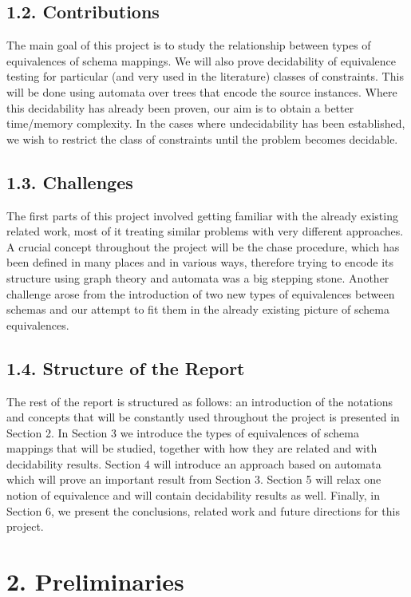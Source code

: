 \documentclass[11pt, a4paper, dvipsnames]{article}
\begin{document}
\subsection{1.2. Contributions}
The main goal of this project is to study the relationship between types of equivalences of schema mappings. We will also prove decidability of equivalence testing for particular (and very used in the literature) classes of constraints. This will be done using automata over trees that encode the source instances. Where this decidability has already been proven, our aim is to obtain a better time/memory complexity. In the cases where undecidability has been established, we wish to restrict the class of constraints until the problem becomes decidable. 

\subsection{1.3. Challenges}
The first parts of this project involved getting familiar with the already existing related work, most of it treating similar problems with very different approaches. A crucial concept throughout the project will be the chase procedure, which has been defined in many places and in various ways, therefore trying to encode its structure using graph theory and automata was a big stepping stone. Another challenge arose from the introduction of two new types of equivalences between schemas and our attempt to fit them in the already existing picture of schema equivalences.

\subsection{1.4. Structure of the Report}
The rest of the report is structured as follows: an introduction of the notations and concepts that will be constantly used throughout the project is presented in Section 2.  In Section 3 we introduce the types of equivalences of schema mappings that will be studied, together with how they are related and with decidability results. Section 4 will introduce an approach based on automata which will prove an important result from Section 3. Section 5 will relax one notion of equivalence and will contain decidability results as well. Finally, in Section 6, we present the conclusions, related work and future directions for this project. 

\newpage

\section{2. Preliminaries}
\end{document}
